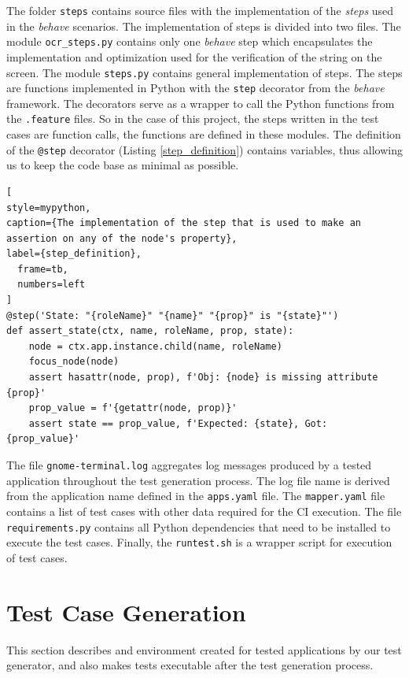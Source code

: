 The folder \texttt{steps} contains source files with the implementation of the \textit{steps} used in the \textit{behave} scenarios. The implementation of steps is divided into two files. The module \texttt{ocr\_steps.py} contains only one \textit{behave} step which encapsulates the implementation and optimization used for the verification of the string on the screen. The module \texttt{steps.py} contains general implementation of steps. The steps are functions implemented in Python with the \texttt{step} decorator from the \textit{behave} framework. The decorators serve as a wrapper to call the Python functions from the \texttt{.feature} files. So in the case of this project, the steps written in the test cases are function calls, the functions are defined in these modules. The definition of the \texttt{@step} decorator (Listing \ref{step_definition}) contains variables, thus allowing us to keep the code base as minimal as possible.

\begin{lstlisting}[
style=mypython,
caption={The implementation of the step that is used to make an assertion on any of the node's property},
label={step_definition},
  frame=tb,
  numbers=left
]
@step('State: "{roleName}" "{name}" "{prop}" is "{state}"')
def assert_state(ctx, name, roleName, prop, state):
    node = ctx.app.instance.child(name, roleName)
    focus_node(node)
    assert hasattr(node, prop), f'Obj: {node} is missing attribute {prop}'
    prop_value = f'{getattr(node, prop)}'
    assert state == prop_value, f'Expected: {state}, Got: {prop_value}'
\end{lstlisting}

The file \texttt{gnome-terminal.log} aggregates log messages produced by a tested application throughout the test generation process. The log file name is derived from the application name defined in the \texttt{apps.yaml} file. The \texttt{mapper.yaml} file contains a list of test cases with other data required for the CI execution. The file \texttt{requirements.py} contains all Python dependencies that need to be installed to execute the test cases. Finally, the \texttt{runtest.sh} is a wrapper script for execution of test cases.

\section{Test Case Generation}\label{generation}

This section describes and environment created for tested applications by our test generator, and also makes tests executable after the test generation process.

